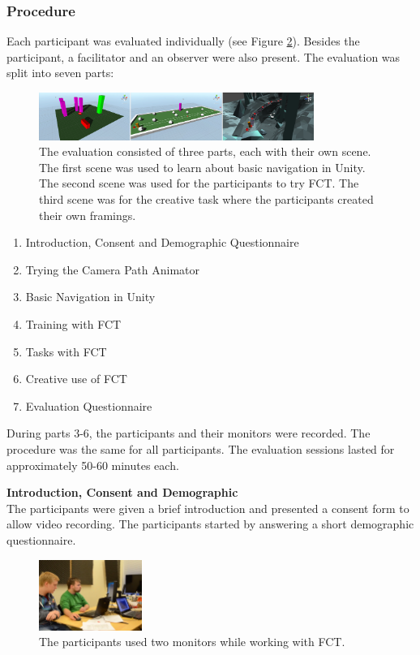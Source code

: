 \subsubsection{Procedure}
Each participant was evaluated individually (see Figure \ref{fig:tt}). Besides the participant, a facilitator and an observer were also present. The evaluation was split into seven parts: 
\begin{figure}[hbtp]
\centering
\includegraphics[width=0.8\textwidth]{Pics/sceneAll_horizontal}
\caption{The evaluation consisted of three parts, each with their own scene. The first scene was used to learn about basic navigation in Unity. The second scene was used for the participants to try FCT. The third scene was for the creative task where the participants created their own framings.}
\label{fig:sceneAll}
\end{figure}

\begin{enumerate}
\item Introduction, Consent and Demographic Questionnaire
\item Trying the Camera Path Animator
\item Basic Navigation in Unity
\item Training with FCT
\item Tasks with FCT
\item Creative use of FCT
\item Evaluation Questionnaire
\end{enumerate}

During parts 3-6, the participants and their monitors were recorded. The procedure was the same for all participants. The evaluation sessions lasted for approximately 50-60 minutes each. 

\textbf{Introduction, Consent and Demographic}\\
The participants were given a brief introduction and presented a consent form to allow video recording. The participants started by answering a short demographic questionnaire. 

\begin{figure}[htbp]
\centering
\includegraphics[width=0.3\textwidth]{Pics/test_setup}
\caption{The participants used two monitors while working with FCT.}
\label{fig:tt}
\end{figure}

